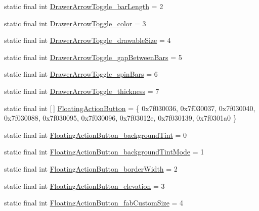\begin{DoxyCompactItemize}
\item 
static final int \mbox{\hyperlink{classandroid_1_1support_1_1design_1_1_r_1_1styleable_a54b35adfa7a299b34c33e6937cf76daf}{Drawer\+Arrow\+Toggle\+\_\+bar\+Length}} = 2
\item 
static final int \mbox{\hyperlink{classandroid_1_1support_1_1design_1_1_r_1_1styleable_ac4d5211c86d092042a0345825deae18b}{Drawer\+Arrow\+Toggle\+\_\+color}} = 3
\item 
static final int \mbox{\hyperlink{classandroid_1_1support_1_1design_1_1_r_1_1styleable_a0cf8966074e0de6dde7fa5cfec03d99e}{Drawer\+Arrow\+Toggle\+\_\+drawable\+Size}} = 4
\item 
static final int \mbox{\hyperlink{classandroid_1_1support_1_1design_1_1_r_1_1styleable_a2ae57027db3b52747cd4fe6891be50ae}{Drawer\+Arrow\+Toggle\+\_\+gap\+Between\+Bars}} = 5
\item 
static final int \mbox{\hyperlink{classandroid_1_1support_1_1design_1_1_r_1_1styleable_a192aaf9e5f494152409e8bd792ca49e6}{Drawer\+Arrow\+Toggle\+\_\+spin\+Bars}} = 6
\item 
static final int \mbox{\hyperlink{classandroid_1_1support_1_1design_1_1_r_1_1styleable_a3ad2ad7d27382bb2a96f303bef508661}{Drawer\+Arrow\+Toggle\+\_\+thickness}} = 7
\item 
static final int \mbox{[}$\,$\mbox{]} \mbox{\hyperlink{classandroid_1_1support_1_1design_1_1_r_1_1styleable_ac39eabec239d50ec950ae5f013825830}{Floating\+Action\+Button}} = \{ 0x7f030036, 0x7f030037, 0x7f030040, 0x7f030088, 0x7f030095, 0x7f030096, 0x7f03012e, 0x7f030139, 0x7f0301a0 \}
\item 
static final int \mbox{\hyperlink{classandroid_1_1support_1_1design_1_1_r_1_1styleable_a85f23456b7532cd6277a61b75950a347}{Floating\+Action\+Button\+\_\+background\+Tint}} = 0
\item 
static final int \mbox{\hyperlink{classandroid_1_1support_1_1design_1_1_r_1_1styleable_aec998f25022d4f6c553ba33ad00d1cb4}{Floating\+Action\+Button\+\_\+background\+Tint\+Mode}} = 1
\item 
static final int \mbox{\hyperlink{classandroid_1_1support_1_1design_1_1_r_1_1styleable_a4357081bb8fe8824282e54ef9f4ae3cc}{Floating\+Action\+Button\+\_\+border\+Width}} = 2
\item 
static final int \mbox{\hyperlink{classandroid_1_1support_1_1design_1_1_r_1_1styleable_a52c86e4b7032178a47c2a0509d3dfa7d}{Floating\+Action\+Button\+\_\+elevation}} = 3
\item 
static final int \mbox{\hyperlink{classandroid_1_1support_1_1design_1_1_r_1_1styleable_a14a34fa7c12a01958348685651d56014}{Floating\+Action\+Button\+\_\+fab\+Custom\+Size}} = 4

\end{DoxyCompactItemize}
